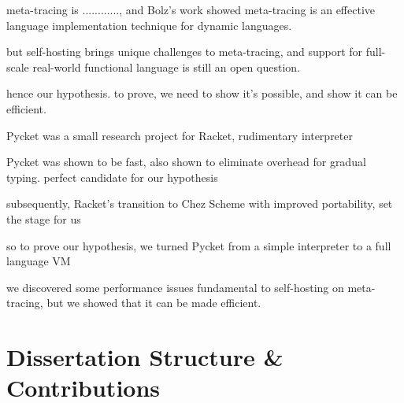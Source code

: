     \begin{paragraph-here}%
        meta-tracing is ............, and Bolz's work showed meta-tracing is an effective language implementation technique for dynamic languages. \cite{bolzPhDThesis}
    \end{paragraph-here}

    \begin{paragraph-here}%
        but self-hosting brings unique challenges to meta-tracing, and support for full-scale real-world functional language is still an open question.
    \end{paragraph-here}

    \begin{paragraph-here}%
        hence our hypothesis. to prove, we need to show it's possible, and show it can be efficient.
    \end{paragraph-here}

    \begin{paragraph-here}%
        Pycket was a small research project for Racket, rudimentary interpreter \cite{bolzMetatracingMakesFast2014}
    \end{paragraph-here}

    \begin{paragraph-here}%
        Pycket was shown to be fast, also shown to eliminate overhead for gradual typing. perfect candidate for our hypothesis \cite{pycketmain,pycketmain2}
    \end{paragraph-here}

    \begin{paragraph-here}%
        subsequently, Racket's transition to Chez Scheme with improved portability, set the stage for us
    \end{paragraph-here}

    \begin{paragraph-here}%
        so to prove our hypothesis, we turned Pycket from a simple interpreter to a full language VM
    \end{paragraph-here}

    \begin{paragraph-here}%
        we discovered some performance issues fundamental to self-hosting on meta-tracing, but we showed that it can be made efficient.
    \end{paragraph-here}

    \section[\texorpdfstring{Dissertation Structure \& Contributions}{Structure \& Contributions}]{Dissertation Structure \& Contributions}


